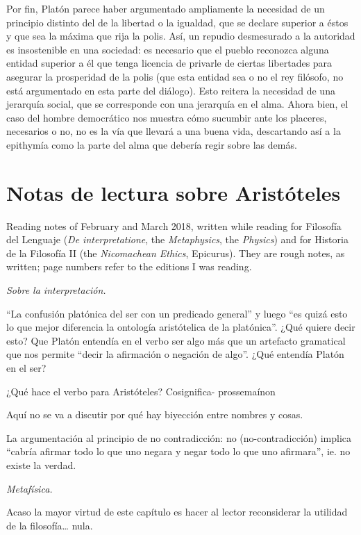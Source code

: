 Por fin, Platón parece haber argumentado
ampliamente la necesidad de un principio
distinto del de la libertad o la igualdad,
que se declare superior a éstos y que sea la
máxima que rija la polis. Así, un repudio
desmesurado a la autoridad es insostenible en
una sociedad: es necesario que el pueblo
reconozca alguna entidad superior a él que
tenga licencia de privarle de ciertas
libertades para asegurar la prosperidad de la
polis (que esta entidad sea o no el rey
filósofo, no está argumentado en esta parte
del diálogo). Esto reitera la necesidad de
una jerarquía social, que se corresponde con
una jerarquía en el alma. Ahora bien, el caso
del hombre democrático nos muestra cómo
sucumbir ante los placeres, necesarios o no,
no es la vía que llevará a una buena vida,
descartando así a la epithymía como la parte
del alma que debería regir sobre las demás.

\section{Notas de lectura sobre Aristóteles}
\label{section-notas-aristoteles}

Reading notes of February and March 2018,
written while reading for Filosofía del
Lenguaje (\emph{De interpretatione}, the
\emph{Metaphysics}, the \emph{Physics}) and
for Historia de la Filosofía II (the
\emph{Nicomachean Ethics}, Epicurus). They
are rough notes, as written; page numbers
refer to the editions I was reading.

\medskip\noindent
\emph{Sobre la interpretación.}

``La confusión platónica del ser con un
predicado general'' y luego ``es quizá esto
lo que mejor diferencia la ontología
aristótelica de la platónica''. ¿Qué quiere
decir esto? Que Platón entendía en el verbo
ser algo más que un artefacto gramatical que
nos permite ``decir la afirmación o negación
de algo''. ¿Qué entendía Platón en el ser?

¿Qué hace el verbo para Aristóteles?
Cosignifica- prossemaínon

Aquí no se va a discutir por qué hay
biyección entre nombres y cosas.

La argumentación al principio de no
contradicción: no (no-contradicción) implica
``cabría afirmar todo lo que uno negara y
negar todo lo que uno afirmara'', ie. no
existe la verdad.

\medskip\noindent\emph{Metafísica.}

Acaso la mayor virtud de este capítulo es
hacer al lector reconsiderar la utilidad de
la filosofía\ldots{} nula.

